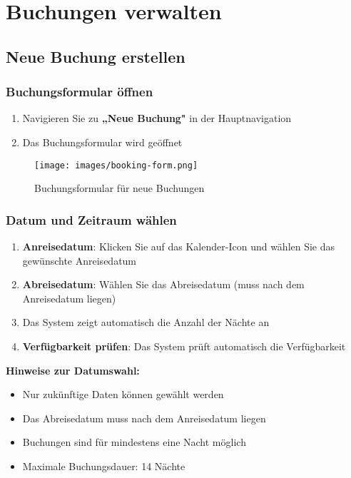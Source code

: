 \section{Buchungen verwalten}
\label{sec:buchungen}

\subsection{Neue Buchung erstellen}

\subsubsection{Buchungsformular öffnen}

\begin{enumerate}
    \item Navigieren Sie zu \textbf{„Neue Buchung"} in der Hauptnavigation
    \item Das Buchungsformular wird geöffnet
\end{enumerate}

\begin{figure}[H]
    \centering
    \texttt{[image: images/booking-form.png]}
    \caption{Buchungsformular für neue Buchungen}
    \label{fig:booking-form}
\end{figure}

\subsubsection{Datum und Zeitraum wählen}

\begin{enumerate}
    \item \textbf{Anreisedatum}: Klicken Sie auf das Kalender-Icon und wählen Sie das gewünschte Anreisedatum
    \item \textbf{Abreisedatum}: Wählen Sie das Abreisedatum (muss nach dem Anreisedatum liegen)
    \item Das System zeigt automatisch die Anzahl der Nächte an
    \item \textbf{Verfügbarkeit prüfen}: Das System prüft automatisch die Verfügbarkeit
\end{enumerate}

\textbf{Hinweise zur Datumswahl:}
\begin{itemize}
    \item Nur zukünftige Daten können gewählt werden
    \item Das Abreisedatum muss nach dem Anreisedatum liegen
    \item Buchungen sind für mindestens eine Nacht möglich
    \item Maximale Buchungsdauer: 14 Nächte
\end{itemize}

